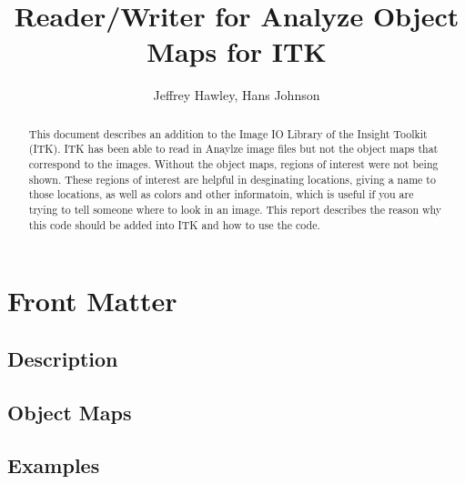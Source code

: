 \documentclass{InsightArticle}
\title{Reader/Writer for Analyze Object Maps for ITK}
\author{Jeffrey Hawley, Hans Johnson }
\begin{document}
\ifpdf
\else
\fi


\maketitle


\ifhtml
\chapter*{Front Matter\label{front}}
\fi


\begin{abstract}
\noindent
This document describes an addition to the Image IO Library of the Insight Toolkit (ITK).
ITK has been able to read in Anaylze image files but not the object maps that correspond
to the images.  Without the object maps, regions of interest were not being shown.
These regions of interest are helpful in desginating locations, giving a name to those
locations, as well as colors and other informatoin, which is useful if you are trying to tell
someone where to look in an image.  This report describes the reason why this code should be
added into ITK and how to use the code.
\end{abstract}

\tableofcontents

\section{Description}

\section{Object Maps}

\section{Examples}
\end{document}
